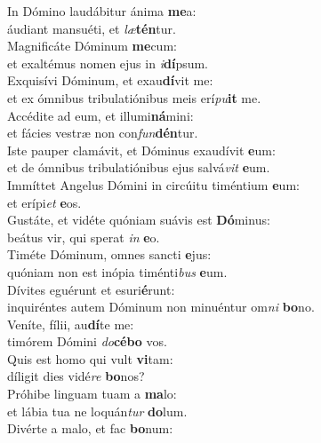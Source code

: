 \evenverse In Dómino laudábitur ánima \textbf{me}a:~\*\\
\evenverse áudiant mansuéti, et \textit{læ}\textbf{tén}tur.\\
\oddverse Magnificáte Dóminum \textbf{me}cum:~\*\\
\oddverse et exaltémus nomen ejus in \textit{i}\textbf{dí}psum.\\
\evenverse Exquisívi Dóminum, et exau\textbf{dí}vit me:~\*\\
\evenverse et ex ómnibus tribulatiónibus meis erí\textit{pu}\textbf{it} me.\\
\oddverse Accédite ad eum, et illumi\textbf{ná}mini:~\*\\
\oddverse et fácies vestræ non con\textit{fun}\textbf{dén}tur.\\
\evenverse Iste pauper clamávit, et Dóminus exaudívit \textbf{e}um:~\*\\
\evenverse et de ómnibus tribulatiónibus ejus salvá\textit{vit} \textbf{e}um.\\
\oddverse Immíttet Angelus Dómini in circúitu timéntium \textbf{e}um:~\*\\
\oddverse et erípi\textit{et} \textbf{e}os.\\
\evenverse Gustáte, et vidéte quóniam suávis est \textbf{Dó}minus:~\*\\
\evenverse beátus vir, qui sperat \textit{in} \textbf{e}o.\\
\oddverse Timéte Dóminum, omnes sancti \textbf{e}jus:~\*\\
\oddverse quóniam non est inópia timénti\textit{bus} \textbf{e}um.\\
\evenverse Dívites eguérunt et esuri\textbf{é}runt:~\*\\
\evenverse inquiréntes autem Dóminum non minuéntur om\textit{ni} \textbf{bo}no.\\
\oddverse Veníte, fílii, au\textbf{dí}te me:~\*\\
\oddverse timórem Dómini \textit{do}\textbf{cé}\textbf{bo} vos.\\
\evenverse Quis est homo qui vult \textbf{vi}tam:~\*\\
\evenverse díligit dies vidé\textit{re} \textbf{bo}nos?\\
\oddverse Próhibe linguam tuam a \textbf{ma}lo:~\*\\
\oddverse et lábia tua ne loquán\textit{tur} \textbf{do}lum.\\
\evenverse Divérte a malo, et fac \textbf{bo}num:~\*\\
